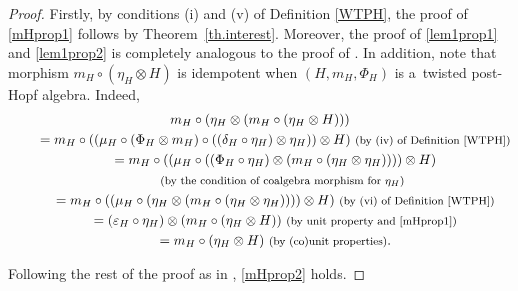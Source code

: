 \documentclass[10pt,a4paper]{amsart}
\numberwithin{equation}{section}
\begin{document}
\begin{proof}
Firstly, by conditions (i) and (v) of Definition \ref{WTPH}, the proof of \eqref{mHprop1} follows by Theorem~\ref{th.interest}. Moreover, the proof of \eqref{lem1prop1} and \eqref{lem1prop2} is completely analogous to the proof of \mbox{\cite[Lemma~3.4]{FGR}}.
In addition, note that morphism $m_{H}\circ(\eta_{H}\otimes H)$ is idempotent when $(H,m_{H},\Phi_{H})$ is a~twisted post-Hopf algebra. Indeed,
\begin{gather*}
 m_{H}\circ(\eta_{H}\otimes(m_{H}\circ(\eta_{H}\otimes H)))\\
 \qquad{}= m_{H}\circ((\mu_{H}\circ(\Phi_{H}\otimes m_{H})\circ ((\delta_{H}\circ\eta_{H})\otimes\eta_{H}))\otimes H)\ \text{\footnotesize\textnormal{(by (iv) of Definition \ref{WTPH})}}\\
 \qquad{}= m_{H}\circ((\mu_{H}\circ((\Phi_{H}\circ\eta_{H})\otimes(m_{H}\circ(\eta_{H}\otimes\eta_{H}))))\otimes H)\\
 \qquad\quad{}\
 \text{\footnotesize\textnormal{(by the condition of coalgebra morphism for $\eta_{H}$)}}\\
 \qquad{}= m_{H}\circ((\mu_{H}\circ(\eta_{H}\otimes(m_{H}\circ(\eta_{H}\otimes\eta_{H}))))\otimes H)\ \text{\footnotesize\textnormal{(by (vi) of Definition \ref{WTPH})}}\\
 \qquad{}= (\varepsilon_{H}\circ\eta_{H})\otimes(m_{H}\circ(\eta_{H}\otimes H))\ \text{\footnotesize\textnormal{(by unit property and \eqref{mHprop1})}}\\
 \qquad{}= m_{H}\circ(\eta_{H}\otimes H)\ \text{\footnotesize\textnormal{(by (co)unit properties)}}.
\end{gather*}

Following the rest of the proof as in \cite[Lemma 3.5]{FGR}, \eqref{mHprop2} holds.
\end{proof}
\end{document}
